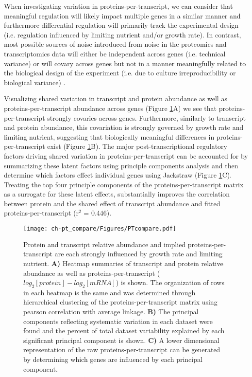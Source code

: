 When investigating variation in proteins-per-transcript, we can consider that meaningful regulation will likely impact multiple genes in a similar manner and furthermore differential regulation will primarily track the experimental design (i.e. regulation influenced by limiting nutrient and/or growth rate).  In contrast, most possible sources of noise introduced from noise in the proteomics and transcriptomics data will either be independent across genes (i.e. technical variance) or will covary across genes but not in a manner meaningfully related to the biological design of the experiment (i.e. due to culture irreproducibility or biological variance) \cite{Leek:2007kn}.

Visualizing shared variation in transcript and protein abundance as well as proteins-per-transcript abundance across genes (Figure \ref{ptHM}A) we see that proteins-per-transcript strongly covaries across genes.  Furthermore, similarly to transcript and protein abundance, this covariation is strongly governed by growth rate and limiting nutrient, suggesting that biologically meaningful differences in proteins-per-transcript exist (Figure \ref{ptHM}B). The major post-transcriptional regulatory factors driving shared variation in proteins-per-transcript can be accounted for by summarizing these latent factors using principle components analysis and then determine which factors effect individual genes using Jackstraw \cite{Chung:2015bq} (Figure \ref{ptHM}C). Treating the top four principle components of the proteins-per-transcript matrix as a surrogate for these latent effects, substantially improves the correlation between protein and the shared effect of transcript abundance and fitted proteins-per-transcript (r$^{2}$ = 0.446).

\begin{figure}[h!]
\begin{center}
\texttt{[image: ch-pt\_compare/Figures/PTcompare.pdf]}
\caption[Protein and transcript relative abundance and implied proteins-per-transcript are each strongly influenced by growth rate and limiting nutrient]{Protein and transcript relative abundance and implied proteins-per-transcript are each strongly influenced by growth rate and limiting nutrient. \textbf{A)} Heatmap summaries of transcript and protein relative abundance as well as proteins-per-transcript ($log_{2}\left[protein\right] - log_{2}\left[mRNA\right]$) is shown. The organization of rows in each heatmap is the same and was determined through hierarchical clustering of the proteins-per-transcript matrix using pearson correlation with average linkage. \textbf{B)} The principal components reflecting systematic variation in each dataset were found and the percent of total dataset variability explained by each significant principal component is shown. \textbf{C)} A lower dimensional representation of the raw proteins-per-transcript can be generated by determining which genes are influenced by each principal component.}
\label{ptHM}
\end{center}
\end{figure}

